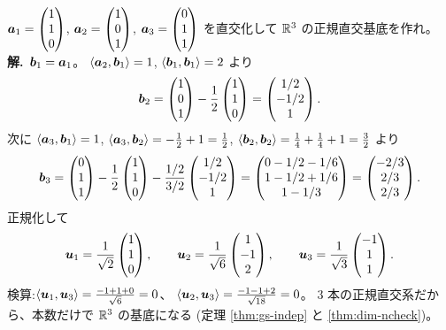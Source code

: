\begin{rei}[例題・標準($3$ 本の直交化)]\label{rei:gs-3vec}
$\bm{a}_1 = \begin{pmatrix}1 \\ 1 \\ 0\end{pmatrix}$, $\bm{a}_2 = \begin{pmatrix}1 \\ 0 \\ 1\end{pmatrix}$,
$\bm{a}_3 = \begin{pmatrix}0 \\ 1 \\ 1\end{pmatrix}$ を直交化して $\mathbb{R}^3$ の正規直交基底を作れ。\\
\textbf{解.}\ $\bm{b}_1 = \bm{a}_1$。
$\langle \bm{a}_2, \bm{b}_1 \rangle = 1$,
$\langle \bm{b}_1, \bm{b}_1 \rangle = 2$ より
\[
\bm{b}_2 = \begin{pmatrix}1 \\ 0 \\ 1\end{pmatrix} - \frac{1}{2}\begin{pmatrix}1 \\ 1 \\ 0\end{pmatrix}
= \begin{pmatrix}1/2 \\ -1/2 \\ 1\end{pmatrix}.
\]
次に $\langle \bm{a}_3, \bm{b}_1 \rangle = 1$,
$\langle \bm{a}_3, \bm{b}_2 \rangle = -\frac{1}{2} + 1 = \frac{1}{2}$,
$\langle \bm{b}_2, \bm{b}_2 \rangle = \frac{1}{4} + \frac{1}{4} + 1
= \frac{3}{2}$ より
\[
\bm{b}_3 = \begin{pmatrix}0 \\ 1 \\ 1\end{pmatrix} - \frac{1}{2}\begin{pmatrix}1 \\ 1 \\ 0\end{pmatrix}
- \frac{1/2}{3/2}\begin{pmatrix}1/2 \\ -1/2 \\ 1\end{pmatrix}
= \begin{pmatrix}0 - 1/2 - 1/6 \\ 1 - 1/2 + 1/6 \\ 1 - 1/3\end{pmatrix}
= \begin{pmatrix}-2/3 \\ 2/3 \\ 2/3\end{pmatrix}.
\]
正規化して
\[
\bm{u}_1 = \frac{1}{\sqrt{2}}\begin{pmatrix}1 \\ 1 \\ 0\end{pmatrix}, \qquad
\bm{u}_2 = \frac{1}{\sqrt{6}}\begin{pmatrix}1 \\ -1 \\ 2\end{pmatrix}, \qquad
\bm{u}_3 = \frac{1}{\sqrt{3}}\begin{pmatrix}-1 \\ 1 \\ 1\end{pmatrix}.
\]
検算:$\langle \bm{u}_1, \bm{u}_3 \rangle = \frac{-1 + 1 + 0}{\sqrt{6}} = 0$、
$\langle \bm{u}_2, \bm{u}_3 \rangle = \frac{-1 - 1 + 2}{\sqrt{18}} = 0$。
$3$ 本の正規直交系だから、本数だけで $\mathbb{R}^3$ の基底になる
(定理 \ref{thm:gs-indep} と \ref{thm:dim-ncheck})。
\end{rei}

